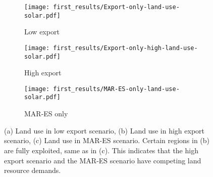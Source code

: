 \begin{figure}[h]
    \centering
    \begin{subfigure}[b]{0.3\textwidth}
        \texttt{[image: first\_results/Export-only-land-use-solar.pdf]}
        \caption{Low export}
        \label{fig:graphic1}
    \end{subfigure}
    \begin{subfigure}[b]{0.3\textwidth}
        \texttt{[image: first\_results/Export-only-high-land-use-solar.pdf]}
        \caption{High export}
        \label{fig:graphic2}
    \end{subfigure}
    \begin{subfigure}[b]{0.3\textwidth}
        \texttt{[image: first\_results/MAR-ES-only-land-use-solar.pdf]}
        \caption{MAR-ES only}
        \label{fig:graphic3}
    \end{subfigure}
    \caption{(a) Land use in low export scenario, (b) Land use in high export scenario, (c) Land use in MAR-ES scenario. Certain regions in
    (b) are fully exploited, same as in (c). This indicates that the high export scenario and the MAR-ES scenario have competing land resource demands.}
    \label{fig:land_use_solar}
\end{figure}
    
